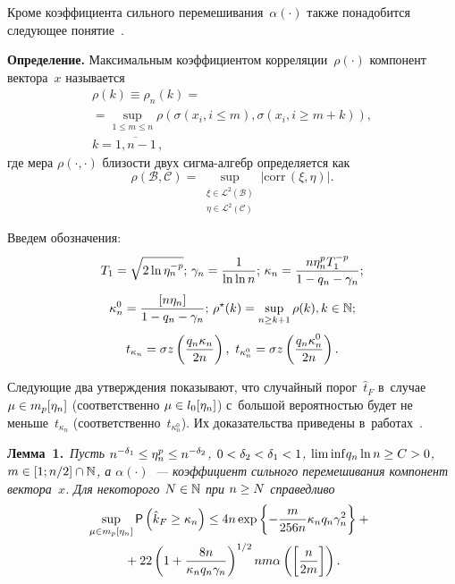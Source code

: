 \begin{multicols}{2}
Кроме коэффициента сильного перемешивания~$\alpha(\cdot)$ также понадобится 
следующее понятие~\cite{Bosq}.

\smallskip

\noindent
\textbf{Определение.} %
Максимальным коэффициентом корреляции~$\rho(\cdot)$ компонент вектора~$x$ 
называется
\begin{multline*}
\rho (k) \equiv \rho_n (k) = {}\\
{}=\sup\limits_{1\leq m\leq n}\rho\left(\sigma(x_i, 
i\leq m), \sigma(x_i, i\geq m+k)\right), \\
 k=\overline{1,n-1}\,,
\end{multline*}
где мера $\rho(\cdot, \cdot)$ близости двух сиг\-ма-ал\-гебр определяется как
$$
\rho(\mathcal{B},\mathcal{C}) = \sup\limits_{\substack{\xi 
\in\mathcal{L}^2(\mathcal{B}) \\
 \eta \in\mathcal{L}^2(\mathcal{C})}} 
\left|\mathrm{corr}\,(\xi, \eta)\right|.
$$


Введем обозначения:
$$
T_1 = \sqrt{2\ln \eta_n^{-p}};  \,\gamma_n = \displaystyle\frac{\displaystyle 1\mathstrut}{\displaystyle \ln\ln n\mathstrut}; \, \kappa_n 
= \displaystyle\frac{\displaystyle n \eta_n^p T_1^{-p}\mathstrut}{\displaystyle 1 - q_n - \gamma_n\mathstrut}; 
$$
$$ 
\kappa_n^0 = \displaystyle\frac{\displaystyle [n \eta_n]\mathstrut}{\displaystyle 1 - q_n - \gamma_n\mathstrut} ;\, \rho^\star (k) = 
\sup\limits_{n\geq k+1} \rho(k), k \in \mathbb{N} ;
$$
$$
t_{\kappa_n} = \sigma z\left(\displaystyle\frac{\displaystyle q_n \kappa_n \mathstrut}{\displaystyle 2n\mathstrut}\right) , \,\, t_{\kappa_n^0} 
= \sigma z\left(\displaystyle\frac{\displaystyle q_n \kappa_n^0 \mathstrut}{\displaystyle 2n\mathstrut}\right).
$$


Следующие два утверждения показывают, что случайный порог~$\hat{t}_F$ в~случае 
$\mu\hm\in m_p[\eta_n]$ (соответственно $\mu\hm\in l_0[\eta_n]$) с~большой 
вероятностью будет не меньше~$t_{\kappa_n}$ (соответственно~$ t_{\kappa_n^0}$). 
Их  доказательства приведены в~работах~\cite{VorontsovShestakov2023, Vorontsov2024}.

\smallskip

\noindent
\textbf{Лемма~1.}\ \textit{Пусть $n^{-\delta_1} \hm\leq \eta_n^p \hm\leq n^{-\delta_2}$, 
$0\hm<\delta_2\hm<\delta_1<1$, $\mathrm{lim\,inf} q_n \ln n \hm\geq C \hm> 0$, 
$m\hm\in[1;n/2]\cap\mathbb{N}$, а $\alpha(\cdot)$~--- коэффициент сильного 
перемешивания компонент вектора~$x$. Для некоторого $N\hm\in\mathbb{N}$ при $n \hm\geq 
N$ справедливо}
\begin{multline*}
\hspace*{-3pt}\sup\limits_{\mu\in m_p[\eta_n]} {\sf P} \left(\hat{k}_F \geq \kappa_n \right) \leq 
4 n \exp\left\{-\displaystyle\frac{\displaystyle m\mathstrut}{\displaystyle 256n\mathstrut}  \kappa_n q_n \gamma_n^2    \right\}+{}\\
{}+ 22\left(1+\displaystyle\frac{\displaystyle 8n\mathstrut}{\displaystyle \kappa_n q_n \gamma_n\mathstrut}\right)^{1/2} n m 
\alpha\left(\left[\displaystyle\frac{\displaystyle n\mathstrut}{\displaystyle 2m\mathstrut}\right]\right).
\end{multline*}




\end{multicols}
